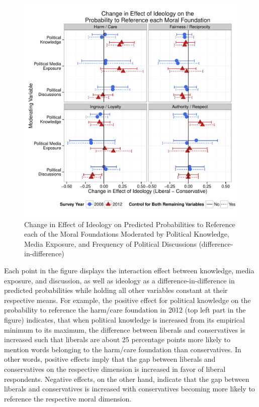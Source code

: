 \documentclass[12pt]{article}
\begin{document}
\begin{figure}\centering
\includegraphics[scale=.5]{../calc/fig/m3b_learn.pdf}
\caption{Change in Effect of Ideology on Predicted Probabilities to Reference each of the Moral Foundations Moderated by Political Knowledge, Media Exposure, and Frequency of Political Discussions (difference-in-difference)}\label{fig:m3b_learn}
\end{figure}

Each point in the figure displays the interaction effect between knowledge, media exposure, and discussion, as well as ideology as a difference-in-difference in predicted probabilities while holding all other variables constant at their respective means. For example, the positive effect for political knowledge on the probability to reference the harm/care foundation in 2012 (top left part in the figure) indicates, that when political knowledge is increased from its empirical minimum to its maximum, the difference between liberals and conservatives is increased such that liberals are about 25 percentage points more likely to mention words belonging to the harm/care foundation than conservatives. In other words, positive effects imply that the gap between liberals and conservatives on the respective dimension is increased in favor of liberal respondents. Negative effects, on the other hand, indicate that the gap between liberals and conservatives is increased with conservatives becoming more likely to reference the respective moral dimension.
\end{document}
